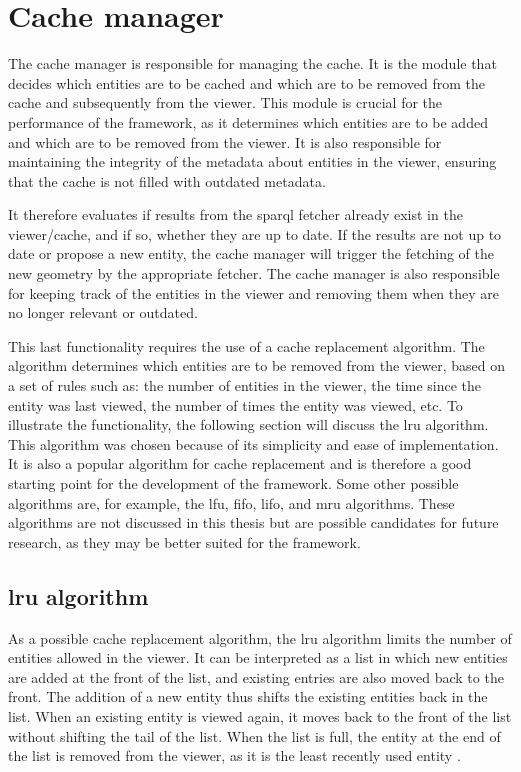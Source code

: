 \section{Cache manager}

The cache manager is responsible for managing the cache. It is the module that decides which entities are to be cached and which are to be removed from the cache and subsequently from the viewer. This module is crucial for the performance of the framework, as it determines which entities are to be added and which are to be removed from the viewer. It is also responsible for maintaining the integrity of the metadata about entities in the viewer, ensuring that the cache is not filled with outdated metadata.

It therefore evaluates if results from the \ac{sparql} fetcher already exist in the viewer/cache, and if so, whether they are up to date. If the results are not up to date or propose a new entity, the cache manager will trigger the fetching of the new geometry by the appropriate fetcher. The cache manager is also responsible for keeping track of the entities in the viewer and removing them when they are no longer relevant or outdated.

This last functionality requires the use of a cache replacement algorithm. The algorithm determines which entities are to be removed from the viewer, based on a set of rules such as: the number of entities in the viewer, the time since the entity was last viewed, the number of times the entity was viewed, etc. To illustrate the functionality, the following section will discuss the \ac{lru} algorithm. This algorithm was chosen because of its simplicity and ease of implementation. It is also a popular algorithm for cache replacement and is therefore a good starting point for the development of the framework. Some other possible algorithms are, for example, the \ac{lfu}, \ac{fifo}, \ac{lifo}, and \ac{mru} algorithms\parencite{cacheAlgorigthms}. These algorithms are not discussed in this thesis but are possible candidates for future research, as they may be better suited for the framework.

\subsection{\acs{lru} algorithm}
As a possible cache replacement algorithm, the \ac{lru} algorithm limits the number of entities allowed in the viewer. It can be interpreted as a list in which new entities are added at the front of the list, and existing entries are also moved back to the front. The addition of a new entity thus shifts the existing entities back in the list. When an existing entity is viewed again, it moves back to the front of the list without shifting the tail of the list. When the list is full, the entity at the end of the list is removed from the viewer, as it is the least recently used entity \parencite{cacheAlgorigthms}.

